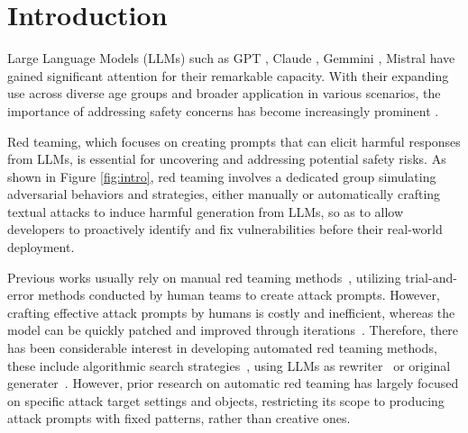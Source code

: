 \section{Introduction}\label{sec:intro}
Large Language Models (LLMs) such as GPT \cite{DBLP:journals/corr/abs-2303-08774}, Claude \cite{citeClaude}, Gemmini \cite{DBLP:journals/corr/abs-2403-05530}, Mistral \cite{DBLP:journals/corr/abs-2310-06825} have gained significant attention for their remarkable capacity. With their expanding use across diverse age groups and broader application in various scenarios, the importance of addressing safety concerns has become increasingly prominent \cite{DBLP:journals/corr/abs-2307-09288, DBLP:journals/corr/abs-2306-15447}.


Red teaming, which focuses on creating prompts that can elicit harmful responses from LLMs, is essential for uncovering and addressing potential safety risks.
As shown in Figure \ref{fig:intro}, red teaming involves a dedicated group simulating adversarial behaviors and strategies, either manually or automatically crafting textual attacks to induce harmful generation from LLMs, so as to allow developers to proactively identify and fix vulnerabilities before their real-world deployment.

Previous works usually rely on manual red teaming methods~\cite{DBLP:journals/corr/abs-2311-03191,DBLP:journals/corr/abs-2312-04127,DBLP:journals/corr/abs-2209-07858,DBLP:conf/emnlp/SchulhoffPKBSAT23}, utilizing trial-and-error methods conducted by human teams to create attack prompts. However, crafting effective attack prompts by humans is costly and inefficient, whereas the model can be quickly patched and improved through iterations~\cite{DBLP:conf/nips/Ouyang0JAWMZASR22,DBLP:journals/corr/abs-2307-01225}. 
Therefore, there has been considerable interest in developing automated red teaming methods, these include algorithmic search strategies~\cite{DBLP:conf/aaai/CasperHK23,DBLP:journals/corr/abs-2310-00322}, using LLMs as rewriter~\cite{DBLP:journals/corr/abs-2309-10253} or original generater~\cite{DBLP:conf/emnlp/PerezHSCRAGMI22}.
However, prior research on automatic red teaming has largely focused on specific attack target settings and objects, restricting its scope to producing attack prompts with fixed patterns, rather than creative ones.

